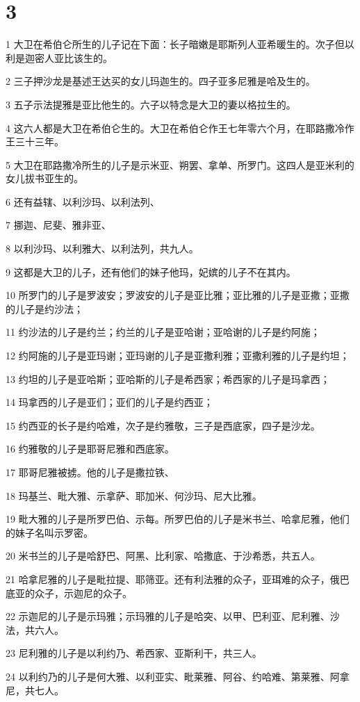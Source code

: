 \chapter{3}

\par 1 大卫在希伯仑所生的儿子记在下面：长子暗嫩是耶斯列人亚希暖生的。次子但以利是迦密人亚比该生的。
\par 2 三子押沙龙是基述王达买的女儿玛迦生的。四子亚多尼雅是哈及生的。
\par 3 五子示法提雅是亚比他生的。六子以特念是大卫的妻以格拉生的。
\par 4 这六人都是大卫在希伯仑生的。大卫在希伯仑作王七年零六个月，在耶路撒冷作王三十三年。
\par 5 大卫在耶路撒冷所生的儿子是示米亚、朔罢、拿单、所罗门。这四人是亚米利的女儿拔书亚生的。
\par 6 还有益辖、以利沙玛、以利法列、
\par 7 挪迦、尼斐、雅非亚、
\par 8 以利沙玛、以利雅大、以利法列，共九人。
\par 9 这都是大卫的儿子，还有他们的妹子他玛，妃嫔的儿子不在其内。
\par 10 所罗门的儿子是罗波安；罗波安的儿子是亚比雅；亚比雅的儿子是亚撒；亚撒的儿子是约沙法；
\par 11 约沙法的儿子是约兰；约兰的儿子是亚哈谢；亚哈谢的儿子是约阿施；
\par 12 约阿施的儿子是亚玛谢；亚玛谢的儿子是亚撒利雅；亚撒利雅的儿子是约坦；
\par 13 约坦的儿子是亚哈斯；亚哈斯的儿子是希西家；希西家的儿子是玛拿西；
\par 14 玛拿西的儿子是亚们；亚们的儿子是约西亚；
\par 15 约西亚的长子是约哈难，次子是约雅敬，三子是西底家，四子是沙龙。
\par 16 约雅敬的儿子是耶哥尼雅和西底家。
\par 17 耶哥尼雅被掳。他的儿子是撒拉铁、
\par 18 玛基兰、毗大雅、示拿萨、耶加米、何沙玛、尼大比雅。
\par 19 毗大雅的儿子是所罗巴伯、示每。所罗巴伯的儿子是米书兰、哈拿尼雅，他们的妹子名叫示罗密。
\par 20 米书兰的儿子是哈舒巴、阿黑、比利家、哈撒底、于沙希悉，共五人。
\par 21 哈拿尼雅的儿子是毗拉提、耶筛亚。还有利法雅的众子，亚珥难的众子，俄巴底亚的众子，示迦尼的众子。
\par 22 示迦尼的儿子是示玛雅；示玛雅的儿子是哈突、以甲、巴利亚、尼利雅、沙法，共六人。
\par 23 尼利雅的儿子是以利约乃、希西家、亚斯利干，共三人。
\par 24 以利约乃的儿子是何大雅、以利亚实、毗莱雅、阿谷、约哈难、第莱雅、阿拿尼，共七人。

